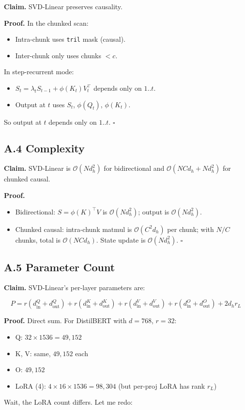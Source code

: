 \textbf{Claim.} SVD-Linear preserves causality.

\textbf{Proof.} In the chunked scan:
\begin{itemize}
\item Intra-chunk uses \texttt{tril} mask (causal).
\item Inter-chunk only uses chunks $< c$.

\end{itemize}
In step-recurrent mode:
\begin{itemize}
\item $S_t = \lambda_t S_{t-1} + \phi(K_t) V_t^\top$ depends only on $1..t$.
\item Output at $t$ uses $S_t$, $\phi(Q_t)$, $\phi(K_t)$.

\end{itemize}
So output at $t$ depends only on $1..t$. $\square$

\subsection{A.4 Complexity}

\textbf{Claim.} SVD-Linear is $\mathcal{O}(N d_h^2)$ for bidirectional and 
$\mathcal{O}(N C d_h + N d_h^2)$ for chunked causal.

\textbf{Proof.} 
\begin{itemize}
\item Bidirectional: $S = \phi(K)^\top V$ is $\mathcal{O}(N d_h^2)$; output
  is $\mathcal{O}(N d_h^2)$.
\item Chunked causal: intra-chunk matmul is $\mathcal{O}(C^2 d_h)$ per chunk;
  with $N/C$ chunks, total is $\mathcal{O}(N C d_h)$. State update is
  $\mathcal{O}(N d_h^2)$. $\square$

\end{itemize}
\subsection{A.5 Parameter Count}

\textbf{Claim.} SVD-Linear's per-layer parameters are:

\[
P = r(d_\text{in}^Q + d_\text{out}^Q) + r(d_\text{in}^K + d_\text{out}^K) + r(d_\text{in}^V + d_\text{out}^V) + r(d_\text{in}^O + d_\text{out}^O) + 2 d_h r_L
\]

\textbf{Proof.} Direct sum. For DistilBERT with $d = 768$, $r = 32$:

\begin{itemize}
\item Q: $32 \times 1536 = 49,152$
\item K, V: same, $49,152$ each
\item O: $49,152$
\item LoRA (4): $4 \times 16 \times 1536 = 98,304$ (but per-proj LoRA has rank $r_L$)

\end{itemize}
Wait, the LoRA count differs. Let me redo:

